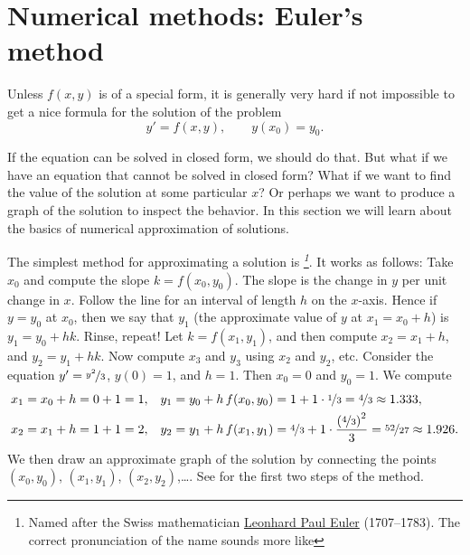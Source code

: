 
\sectionnewpage
\section{Numerical methods: Euler's method}
\label{numer:section}


%


Unless $f(x,y)$ is of a special form,
it is generally very hard
if not impossible to get a nice formula for the solution of the problem
\begin{equation*}
y' = f(x,y), \qquad y(x_0) = y_0 .
\end{equation*}

If the equation can be solved in closed form, we should do that.
But what if we have an equation that cannot be solved in closed form?
What if we want to find the value of the solution at some particular $x$?
Or perhaps we want to produce a graph of the solution to inspect the
behavior.  In this section we will learn about the basics of numerical
approximation of solutions.

The simplest method for approximating a solution is
\emph{%
\footnote{Named after the Swiss mathematician
\href{https://en.wikipedia.org/wiki/Euler}{Leonhard Paul Euler}
(1707--1783).  The correct pronunciation of the name sounds more
like }}.  It works as follows:
Take $x_0$ and compute the slope $k = f(x_0,y_0)$.  The slope is the
change in $y$ per unit change in $x$.  Follow the line for an interval of
length $h$ on the $x$-axis.  Hence if $y = y_0$ at $x_0$, then we say that
$y_1$ (the approximate value of $y$ at $x_1 = x_0 + h$) is
$y_1 = y_0 + h k$.
Rinse, repeat!  Let $k = f(x_1,y_1)$, and then compute
$x_2 = x_1 + h$, and $y_2 = y_1 + h k$.
Now compute $x_3$ and $y_3$ using $x_2$ and $y_2$, etc.
Consider the equation $y' = \nicefrac{y^2}{3}$, $y(0)=1$, and $h=1$.
Then $x_0=0$ and $y_0 = 1$.  We compute
\begin{align*}
& x_1 = x_0 + h = 0 + 1 = 1, & & y_1 = y_0 + h \, f(x_0,y_0) = 1 + 1 \cdot
\nicefrac{1}{3} = \nicefrac{4}{3} \approx 1.333,\\
& x_2 = x_1 + h = 1 + 1 = 2, & & y_2 = y_1 + h \, f(x_1,y_1) =
\nicefrac{4}{3} + 1 \cdot \frac{{(\nicefrac{4}{3})}^2}{3} =
\nicefrac{52}{27} \approx 1.926.
\end{align*}
We then draw an approximate graph of the solution by
connecting the points
$(x_0,y_0)$,
$(x_1,y_1)$,
$(x_2,y_2)$,\dots.
See 
for the first two steps of the method.

